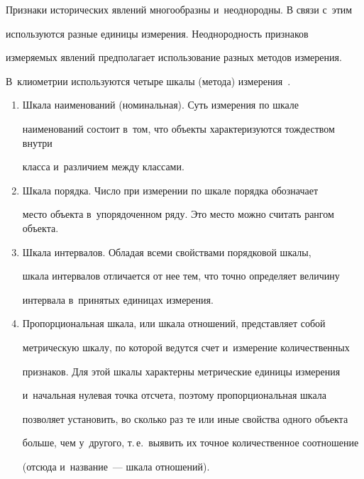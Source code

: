 Признаки исторических явлений многообразны и~неоднородны. В связи с~этим 


используются разные единицы измерения. Неоднородность признаков 


измеряемых явлений предполагает использование разных методов измерения. 


В~клиометрии используются четыре шкалы (метода) измерения~\cite{10-ad}.





\noindent


  \begin{enumerate}


  \item  Шкала наименований (номинальная). Суть измерения по шкале 


наименований состоит в~том, что объекты характеризуются тождеством внутри 


класса и~различием между классами.\\[-14pt]


  \item Шкала порядка. Число при измерении по шкале порядка обозначает 


место объекта в~упорядоченном ряду. Это место можно считать рангом объекта.\\[-14pt] 


  \item Шкала интервалов. Обладая всеми свойствами порядковой шкалы, 


шкала интервалов отличается от нее тем, что точно определяет величину 


интервала в~принятых единицах измерения.\\[-14pt]


  \item Пропорциональная шкала, или шкала отношений, представляет собой 


мет\-ри\-че\-скую шкалу, по которой ведутся счет и~измерение количественных 


признаков. Для этой шкалы характерны метрические единицы измерения 


и~начальная нулевая точка отсчета, поэтому пропорциональная шкала 


позволяет установить, во сколько раз те или иные свойства одного объекта 


больше, чем у~другого, т.\,е.\ выявить их точное количественное соотношение 


(отсюда и~название~--- шкала отношений). 


  \end{enumerate}


